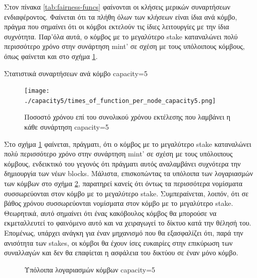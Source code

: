 \documentclass{article}
\newcommand{\eng}[1]{\foreignlanguage{english}{#1}} %
\begin{document}
Στον πίνακα \ref{tab:fairness-funcs} φαίνονται οι κλήσεις μερικών συναρτήσεων
ενδιαφέροντος. Φαίνεται ότι τα πλήθη όλων των κλήσεων είναι ίδια ανά κόμβο,
πράγμα που σημαίνει ότι οι κόμβοι εκτελούν τις ίδιες λειτουργίες με την ίδια
συχνότητα. Παρ'όλα αυτά, ο κόμβος με το μεγαλύτερο \eng{stake} καταναλώνει πολύ
περισσότερο χρόνο στην συνάρτηση \eng{mint'} σε σχέση με τους υπόλοιπους
κόμβους, όπως φαίνεται και στο σχήμα \ref{fig:fairness-funcs}.

\begin{table}[ht]
    \centering
    \caption{Στατιστικά συναρτήσεων ανά κόμβο \eng{capacity=5}}
    \label{tab:fairness-funcs}
\end{table}

\begin{figure}[ht]
    \centering
    \texttt{[image: ./capacity5/times\_of\_function\_per\_node\_capacity5.png]}
    \caption{Ποσοστό χρόνου επί του συνολικού χρόνου εκτέλεσης που λαμβάνει η κάθε συνάρτηση \eng{capacity=5}}
    \label{fig:fairness-funcs}
\end{figure}
\FloatBarrier

Στο σχήμα \ref{fig:fairness-funcs} φαίνεται, πράγματι, ότι ο κόμβος με το
μεγαλύτερο \eng{stake} καταναλώνει πολύ περισσότερο χρόνο στην συνάρτηση
\eng{mint'} σε σχέση με τους υπόλοιπους κόμβους, ενδεικτικό του γεγονός ότι
πράγματι αυτός αναλαμβάνει συχνότερα την δημιουργία των νέων \eng{blocks}.
Μάλιστα, επισκοπώντας τα υπόλοιπα των λογαριασμών των κόμβων στο σχήμα
\ref{fig:fairness-balances}, παρατηρεί κανείς ότι όντως τα περισσότερα
νομίσματα συσσωρεύονται στον κόμβο με το μεγαλύτερο \eng{stake}. Συμπεραίνεται,
λοιπόν, ότι σε βάθος χρόνου συσσωρεύονται νομίσματα στον κόμβο με το μεγαλύτερο
\eng{stake}. Θεωρητικά, αυτό σημαίνει ότι ένας κακόβουλος κόμβος θα μπορούσε
να εκμεταλλευτεί το φαινόμενο αυτό και να χειραγωγεί το δίκτυο κατά την
θέλησή του. Επομένως, υπάρχει ανάγκη για έναν μηχανισμό που θα εξασφαλίζει
ότι, παρά την ανισότητα των \eng{stakes}, οι κόμβοι θα έχουν ίσες ευκαιρίες
στην επικύρωση των συναλλαγών και δεν θα επαφίεται η ασφάλεια του δικτύου
σε έναν μόνο κόμβο.

\begin{figure}[h]
    \centering    
    \begin{varwidth}{\linewidth}
        
    \end{varwidth}
    \caption{Υπόλοιπα λογαριασμών κόμβων \eng{capacity=5}}
    \label{fig:fairness-balances}
\end{figure}
\end{document}

